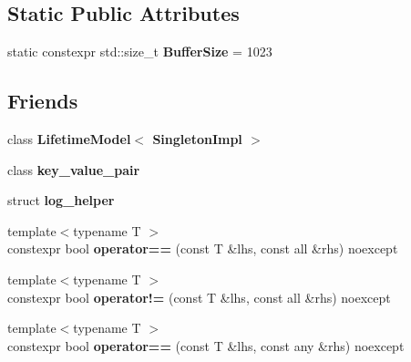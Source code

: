 \subsection*{Static Public Attributes}
\begin{CompactItemize}
\item 
\hypertarget{classhope_1_1final_956a53f1be43cefc4ec367bb59d93741}{
static constexpr std::size\_\-t \textbf{BufferSize} = 1023}
\label{classhope_1_1final_956a53f1be43cefc4ec367bb59d93741}

\end{CompactItemize}
\subsection*{Friends}
\begin{CompactItemize}
\item 
\hypertarget{classhope_1_1final_d8937554df8f60f7d5a139a6e1cdf30c}{
class \textbf{LifetimeModel$<$ SingletonImpl $>$}}
\label{classhope_1_1final_d8937554df8f60f7d5a139a6e1cdf30c}

\item 
\hypertarget{classhope_1_1final_d4eb20df876e902e975bf963da1ccf3e}{
class \textbf{key\_\-value\_\-pair}}
\label{classhope_1_1final_d4eb20df876e902e975bf963da1ccf3e}

\item 
\hypertarget{classhope_1_1final_062105058b490688776712c2f521b652}{
struct \textbf{log\_\-helper}}
\label{classhope_1_1final_062105058b490688776712c2f521b652}

\item 
\hypertarget{classhope_1_1final_da168e37d00bf11194fa7af409a23e2f}{
{\footnotesize template$<$typename T $>$ }\\constexpr bool \textbf{operator==} (const T \&lhs, const all \&rhs) noexcept}
\label{classhope_1_1final_da168e37d00bf11194fa7af409a23e2f}

\item 
\hypertarget{classhope_1_1final_4c9701d52b4c887172d578270d0ef889}{
{\footnotesize template$<$typename T $>$ }\\constexpr bool \textbf{operator!=} (const T \&lhs, const all \&rhs) noexcept}
\label{classhope_1_1final_4c9701d52b4c887172d578270d0ef889}

\item 
\hypertarget{classhope_1_1final_352e0f1c775282fed9323e1606d74f15}{
{\footnotesize template$<$typename T $>$ }\\constexpr bool \textbf{operator==} (const T \&lhs, const any \&rhs) noexcept}
\label{classhope_1_1final_352e0f1c775282fed9323e1606d74f15}


\end{CompactItemize}
